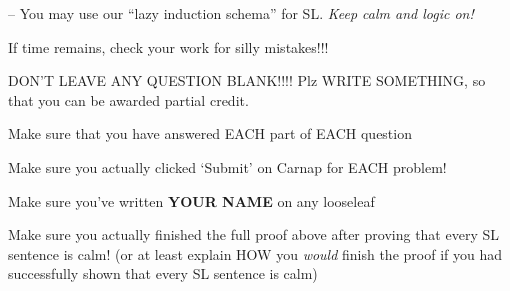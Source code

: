 \documentclass[12pt]{article}
\def\enot{\ensuremath{{\sim}}} %
\let\oldsim\sim %
\renewcommand{\sim}{{\oldsim}} %
\def\nentails{\ensuremath{\nvDash}}
\begin{document}
-- You may use our ``lazy induction schema'' for SL. \textit{Keep calm and logic on!} \\


\item[] If time remains, check your work for silly mistakes!!!

\item[] DON'T LEAVE ANY QUESTION BLANK!!!! Plz WRITE SOMETHING, so that you can be awarded partial credit. 

\item[] Make sure that you have answered EACH part of EACH question

\item[] Make sure you actually clicked `Submit' on Carnap for EACH problem!

\item[] Make sure you've written \textbf{YOUR NAME} on any looseleaf \\ 

\item[] Make sure you actually finished the full proof above after proving that every SL sentence is calm! (or at least explain HOW you \textit{would} finish the proof if you had successfully shown that every SL sentence is calm)




\end{document}
